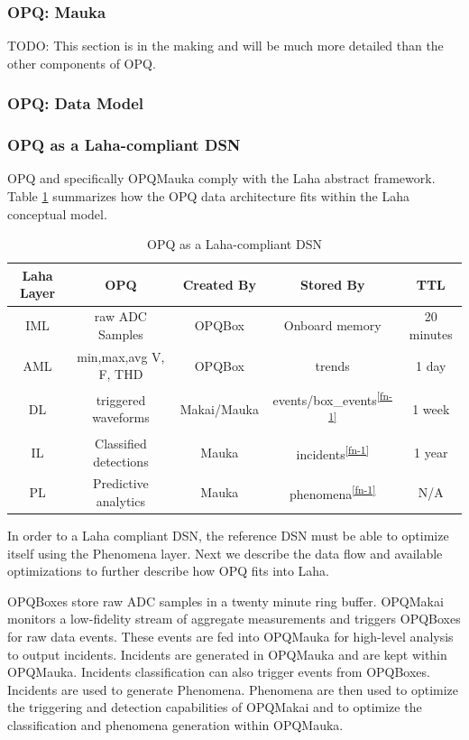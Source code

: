 \subsubsection{OPQ: Mauka}

TODO: This section is in the making and will be much more detailed than the other components of OPQ.

\subsubsection{OPQ: Data Model}

\subsubsection{OPQ as a Laha-compliant DSN}
OPQ and specifically OPQMauka comply with the Laha abstract framework. Table \ref{opq-compliance} summarizes how the OPQ data architecture fits within the Laha conceptual model.

\begin{table}
	\caption{OPQ as a Laha-compliant DSN}
	\begin{tabular}{|c|c|c|c|c|}
		\hline 
		Laha Layer & OPQ & Created By & Stored By & TTL \\ 
		\hline 
		IML & raw ADC Samples & OPQBox & Onboard memory & 20 minutes \\ 
		\hline 
		AML & min,max,avg V, F, THD & OPQBox & trends\footnotemark & 1 day \\ 
		\hline 	
		DL & triggered waveforms & Makai/Mauka & events/box\_events\textsuperscript{\ref{fn-1}} & 1 week \\
		\hline
		IL & Classified detections & Mauka & incidents\textsuperscript{\ref{fn-1}} & 1 year \\
		\hline
		PL & Predictive analytics & Mauka & phenomena\textsuperscript{\ref{fn-1}} & N/A \\
		\hline
	\end{tabular}

\label{opq-compliance}
\end{table}  

In order to a Laha compliant DSN, the reference DSN must be able to optimize itself using the Phenomena layer. Next we describe the data flow and available optimizations to further describe how OPQ fits into Laha.

OPQBoxes store raw ADC samples in a twenty minute ring buffer. OPQMakai monitors a low-fidelity stream of aggregate measurements and triggers OPQBoxes for raw data events. These events are fed into OPQMauka for high-level analysis to output incidents. Incidents are generated in OPQMauka and are kept within OPQMauka. Incidents classification can also trigger events from OPQBoxes. Incidents are used to generate Phenomena. Phenomena are then used to optimize the triggering and detection capabilities of OPQMakai and to optimize the classification and phenomena generation within OPQMauka. 



